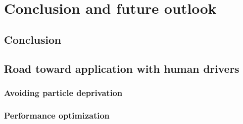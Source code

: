 \chapter{Conclusion and future outlook}
\label{ch:conclusion}

\section{Conclusion}




\section{Road toward application with human drivers}
\subsection{Avoiding particle deprivation}

\subsection{Performance optimization}
\label{sec:perf_opt}




